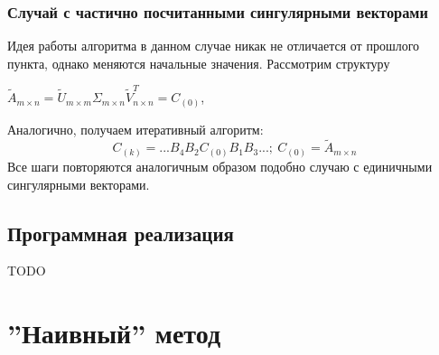 \subsubsection{Случай с частично посчитанными сингулярными векторами} %
Идея работы алгоритма в данном случае никак не отличается от прошлого пункта, однако меняются начальные значения. Рассмотрим структуру 
\begin{center}
    $\tilde{A}_{m \times n} = \tilde{U}_{m\times m}\Sigma_{m\times n}\tilde{V}^T_{n \times n} = C_{(0)}$,
\end{center}
Аналогично, получаем итеративный алгоритм:
\begin{equation}
    C_{(k)}=...B_4B_2C_{(0)}B_1B_3...;\ C_{(0)} = \tilde{A}_{m \times n}
\end{equation}
Все шаги повторяются аналогичным образом подобно случаю с единичными сингулярными векторами.

\subsection{Программная реализация}

TODO






\newpage
\section{''Наивный'' метод}


